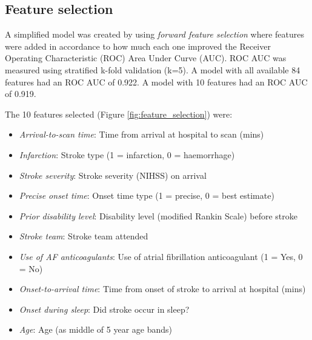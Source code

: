 \subsection{Feature selection}

A simplified model was created by using \emph{forward feature selection} where features were added in accordance to how much each one improved the Receiver Operating Characteristic (ROC) Area Under Curve (AUC). ROC AUC was measured using stratified k-fold validation (k=5). A model with all available 84 features had an ROC AUC of 0.922. A model with 10 features had an ROC AUC of 0.919.

The 10 features selected (Figure \ref{fig:feature_selection}) were:

\begin{itemize}
    \item \emph{Arrival-to-scan time}: Time from arrival at hospital to scan (mins)
    \item \emph{Infarction}: Stroke type (1 = infarction, 0 = haemorrhage)
    \item \emph{Stroke severity}: Stroke severity (NIHSS) on arrival
    \item \emph{Precise onset time}: Onset time type (1 = precise, 0 = best estimate)
    \item \emph{Prior disability level}: Disability level (modified Rankin Scale) before stroke
    \item \emph{Stroke team}: Stroke team attended
    \item \emph{Use of AF anticoagulants}: Use of atrial fibrillation anticoagulant (1 = Yes, 0 = No)
    \item \emph{Onset-to-arrival time}: Time from onset of stroke to arrival at hospital (mins)
    \item \emph{Onset during sleep}: Did stroke occur in sleep?
    \item \emph{Age}: Age (as middle of 5 year age bands)
\end{itemize}


